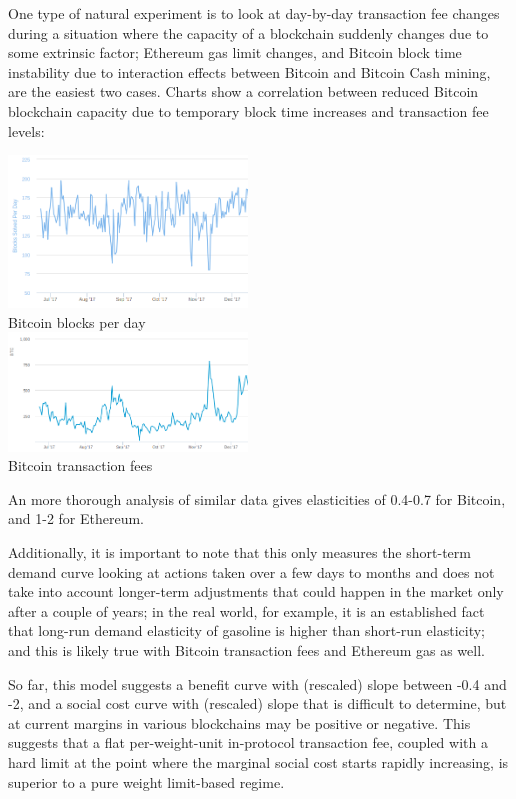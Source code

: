 \documentclass[12pt, final]{article}
\begin{document}
One type of natural experiment is to look at day-by-day transaction fee changes during a situation where the capacity of a blockchain suddenly changes due to some extrinsic factor; Ethereum gas limit changes, and Bitcoin block time instability due to interaction effects between Bitcoin and Bitcoin Cash mining, are the easiest two cases. Charts show a correlation between reduced Bitcoin blockchain capacity due to temporary block time increases and transaction fee levels:

\begin{center}
\includegraphics[width=2.5in]{bitcoin1.png} \\
Bitcoin blocks per day \\
\includegraphics[width=2.5in]{bitcoin2.png} \\
Bitcoin transaction fees
\label{fig:three}
\end{center}

An more thorough analysis of similar data\cite{demand-elasticity} gives elasticities of 0.4-0.7 for Bitcoin, and 1-2 for Ethereum.

Additionally, it is important to note that this only measures the short-term demand curve looking at actions taken over a few days to months and does not take into account longer-term adjustments that could happen in the market only after a couple of years; in the real world, for example, it is an established fact that long-run demand elasticity of gasoline is higher than short-run elasticity\cite{env-econ}; and this is likely true with Bitcoin transaction fees and Ethereum gas as well.

So far, this model suggests a benefit curve with (rescaled) slope between -0.4 and -2, and a social cost curve with (rescaled) slope that is difficult to determine, but at current margins in various blockchains may be positive or negative. This suggests that a flat per-weight-unit in-protocol transaction fee, coupled with a hard limit at the point where the marginal social cost starts rapidly increasing, is superior to a pure weight limit-based regime.
\end{document}
